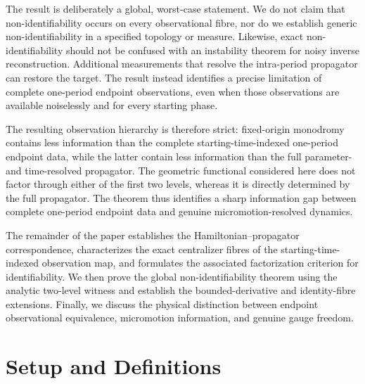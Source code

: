 \documentclass[twocolumn,prl,aps,floatfix]{revtex4-2}
\begin{document}
The result is deliberately a global, worst-case statement. We do not claim that non-identifiability occurs on every observational fibre, nor do we establish generic non-identifiability in a specified topology or measure. Likewise, exact non-identifiability should not be confused with an instability theorem for noisy inverse reconstruction. Additional measurements that resolve the intra-period propagator can restore the target. The result instead identifies a precise limitation of complete one-period endpoint observations, even when those observations are available noiselessly and for every starting phase.

The resulting observation hierarchy is therefore strict: fixed-origin monodromy contains less information than the complete starting-time-indexed one-period endpoint data, while the latter contain less information than the full parameter- and time-resolved propagator. The geometric functional considered here does not factor through either of the first two levels, whereas it is directly determined by the full propagator. The theorem thus identifies a sharp information gap between complete one-period endpoint data and genuine micromotion-resolved dynamics.

The remainder of the paper establishes the Hamiltonian--propagator correspondence, characterizes the exact centralizer fibres of the starting-time-indexed observation map, and formulates the associated factorization criterion for identifiability. We then prove the global non-identifiability theorem using the analytic two-level witness and establish the bounded-derivative and identity-fibre extensions. Finally, we discuss the physical distinction between endpoint observational equivalence, micromotion information, and genuine gauge freedom.


\section{Setup and Definitions}
\end{document}
